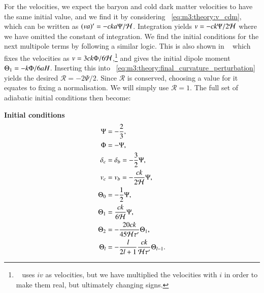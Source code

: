        For the velocities, we expect the baryon and cold dark matter velocities to have the same initial value, and we find it by considering ~\cref{eq:m3:theory:v_cdm}, which can be written as $(va)'=-cka\Psi/\mathcal{H}$. Integration yields $v=-ck\Psi/2\mathcal{H}$ where we have omitted the constant of integration. We find the initial conditions for the next multipole terms by following a similar logic. This is also shown in ~\cite[Eq. 7.59]{dodelson2020modern} which fixes the velocities as $v=3ck\Phi/6\mathcal{H}$,\footnote{~\cite{dodelson2020modern} uses $iv$ as velocities, but we have multiplied the velocities with $i$ in order to make them real, but ultimately changing signs.} and gives the initial dipole moment $\Theta_1 = -k\Phi/6aH$. Inserting this into ~\cref{eq:m3:theory:final_curvature_perturbation} yields the desired $\mathcal{R}=-2\Psi/2$. Since $\mathcal{R}$ is conserved, choosing a value for it equates to fixing a normalisation. We will simply use $\mathcal{R}=1$. The full set of adiabatic initial conditions then become: 
        
        \begin{tcolorbox}[
            width=1.025\linewidth,
            colback=blue!5!white,
            colframe=white
            ]
            \textbf{Initial conditions}
            \begin{subequations}\label{eq:m3:theory:initial_conditions}
                \begin{align}
                    \Psi &= -\frac{2}{3}, \label{eq:m3:theory:initial_conditions_Psi}\\
                    \Phi &= -\Psi, \label{eq:m3:theory:initial_conditions_Phi}\\
                    \delta_c &= \delta_b = -\frac{3}{2}\Psi, \label{eq:m3:theory:initial_conditions_deltas}\\
                    v_c &= v_b = -\frac{ck}{2\mathcal{H}}\Psi, \label{eq:m3:theory:initial_conditions_vs}\\ 
                    \Theta_0 &= -\frac{1}{2}\Psi, \label{eq:m3:theory:initial_conditions_monopole}\\
                    \Theta_1 &= \frac{ck}{6\mathcal{H}}\Psi, \label{eq:m3:theory:initial_conditions_dipole}\\
                    \Theta_2 &= -\frac{20ck}{45\mathcal{H}\tau'}\Theta_1, \label{eq:m3:theory:initial_conditions_quadrapole}\\
                    \Theta_l &= -\frac{l}{2l+1}\frac{ck}{\mathcal{H}\tau'}\Theta_{l-1}.\label{eq:m3:theory:initial_conditions_multipoles}
                \end{align}
            \end{subequations}
        \end{tcolorbox}

